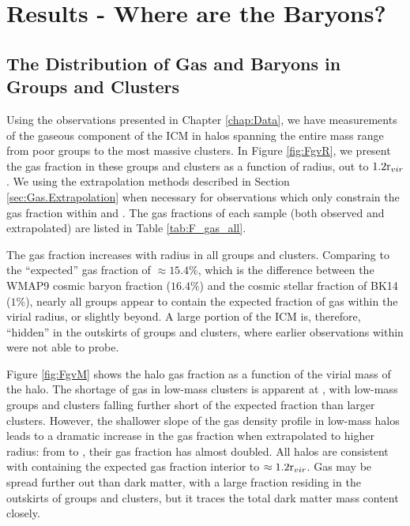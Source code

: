 \chapter{Results - Where are the Baryons?}
\label{chap:Results}

\section{The Distribution of Gas and Baryons in Groups and Clusters}
\label{sec:Spatial}

Using the observations presented in Chapter \ref{chap:Data}, we have
measurements of the gaseous component of the ICM in halos spanning the
entire mass range from poor groups to the most massive clusters. In
Figure \ref{fig:FgvR}, we present the gas fraction in these groups and
clusters as a function of radius, out to $1.2\textrm{r\ensuremath{_{vir}}}{}$. We using the
extrapolation methods described in Section \ref{sec:Gas.Extrapolation}
when necessary for observations which only constrain the gas fraction
within \rfive{} and \rtwo{}. The gas fractions of
each sample (both observed and extrapolated) are listed in Table
\ref{tab:F_gas_all}.

The gas fraction increases with radius in all groups and
clusters. Comparing to the ``expected'' gas fraction of $\approx
15.4\%$, which is the difference between the WMAP9 cosmic baryon
fraction ($16.4\%$) and the cosmic stellar fraction of BK14 ($1\%$),
nearly all groups appear to contain the expected fraction of gas
within the virial radius, or slightly beyond. A large portion of the
ICM is, therefore, ``hidden'' in the outskirts of groups and clusters,
where earlier observations within \rfive{} were not able to probe.



 

Figure \ref{fig:FgvM} shows the halo gas fraction as a function of the
virial mass of the halo. The shortage of gas in low-mass clusters is
apparent at \rfive{}, with low-mass groups and clusters falling
further short of the expected fraction than larger clusters. However,
the shallower slope of the gas density profile in low-mass halos leads
to a dramatic increase in the gas fraction when extrapolated to higher
radius: from \rfive{} to \rvir{}, their gas fraction has almost
doubled. All halos are consistent with containing the expected gas
fraction interior to $\approx1.2\textrm{r\ensuremath{_{vir}}}$. Gas may be spread further out
than dark matter, with a large fraction residing in the outskirts of
groups and clusters, but it traces the total dark matter mass content
closely.

